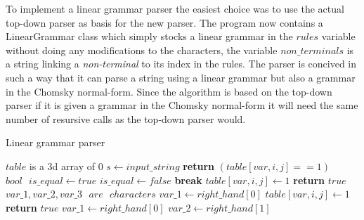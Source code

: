 To implement a linear grammar parser the easiest choice was to use the actual top-down parser as basis for the new parser.
The program now contains a LinearGrammar class which simply stocks a linear grammar in the $rules$ variable without doing any modifications to the characters, the variable $non\_terminals$ is a string linking a \textit{non-terminal} to its index in the rules.
The parser is concived in such a way that it can parse a string using a linear grammar but also a grammar in the Chomsky normal-form.
Since the algorithm is based on the top-down parser if it is given a grammar in the Chomsky normal-form it will need the same number of resursive calls as the top-down parser would.

\FloatBarrier
\begin{algorithm}
\caption{Linear grammar parser}
\label{parse}
\begin{algorithmic}[1]
    \State $table$ is a 3d array of 0
    \State $s \gets input\_string$
     
            \State \textbf{return} $(table[var, i, j] == 1)$
        \EndIf
                \State $bool \text{ } is\_equal \gets true$
                       \State $is\_equal \gets false$
                        \State \textbf{break}
                    \EndIf
                \EndFor
                    \State $table[var, i, j] \gets 1$
                    \State \textbf{return} $true$
                \EndIf
            \EndIf
            \State $var\_1, var\_2, var\_3 \text{ } are \text{ } characters$
                \State $var\_1 \gets right\_hand[0]$
                        \State $table[var, i, j] \gets 1$
                        \State \textbf{return} $true$
                    \EndIf
                \EndIf
                \State $var\_1 \gets right\_hand[0]$
                \State $var\_2 \gets right\_hand[1]$

\end{algorithmic}
\end{algorithm}
